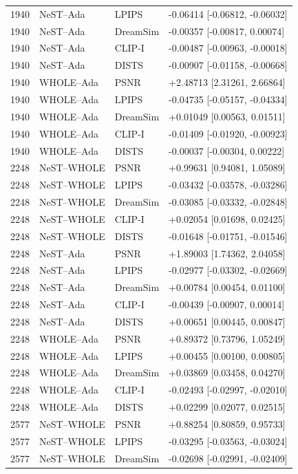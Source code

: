 \documentclass[10pt,letterpaper]{article}
\begin{document}
\begin{longtable}{@{}rlll@{}}
1940 & NeST--Ada & LPIPS & -0.06414 [-0.06812, -0.06032]\\
1940 & NeST--Ada & DreamSim & -0.00357 [-0.00817, 0.00074]\\
1940 & NeST--Ada & CLIP-I & -0.00487 [-0.00963, -0.00018]\\
1940 & NeST--Ada & DISTS & -0.00907 [-0.01158, -0.00668]\\
1940 & WHOLE--Ada & PSNR & +2.48713 [2.31261, 2.66864]\\
1940 & WHOLE--Ada & LPIPS & -0.04735 [-0.05157, -0.04334]\\
1940 & WHOLE--Ada & DreamSim & +0.01049 [0.00563, 0.01511]\\
1940 & WHOLE--Ada & CLIP-I & -0.01409 [-0.01920, -0.00923]\\
1940 & WHOLE--Ada & DISTS & -0.00037 [-0.00304, 0.00222]\\
2248 & NeST--WHOLE & PSNR & +0.99631 [0.94081, 1.05089]\\
2248 & NeST--WHOLE & LPIPS & -0.03432 [-0.03578, -0.03286]\\
2248 & NeST--WHOLE & DreamSim & -0.03085 [-0.03332, -0.02848]\\
2248 & NeST--WHOLE & CLIP-I & +0.02054 [0.01698, 0.02425]\\
2248 & NeST--WHOLE & DISTS & -0.01648 [-0.01751, -0.01546]\\
2248 & NeST--Ada & PSNR & +1.89003 [1.74362, 2.04058]\\
2248 & NeST--Ada & LPIPS & -0.02977 [-0.03302, -0.02669]\\
2248 & NeST--Ada & DreamSim & +0.00784 [0.00454, 0.01100]\\
2248 & NeST--Ada & CLIP-I & -0.00439 [-0.00907, 0.00014]\\
2248 & NeST--Ada & DISTS & +0.00651 [0.00445, 0.00847]\\
2248 & WHOLE--Ada & PSNR & +0.89372 [0.73796, 1.05249]\\
2248 & WHOLE--Ada & LPIPS & +0.00455 [0.00100, 0.00805]\\
2248 & WHOLE--Ada & DreamSim & +0.03869 [0.03458, 0.04270]\\
2248 & WHOLE--Ada & CLIP-I & -0.02493 [-0.02997, -0.02010]\\
2248 & WHOLE--Ada & DISTS & +0.02299 [0.02077, 0.02515]\\
2577 & NeST--WHOLE & PSNR & +0.88254 [0.80859, 0.95733]\\
2577 & NeST--WHOLE & LPIPS & -0.03295 [-0.03563, -0.03024]\\
2577 & NeST--WHOLE & DreamSim & -0.02698 [-0.02991, -0.02409]\\

\end{longtable}
\end{document}
